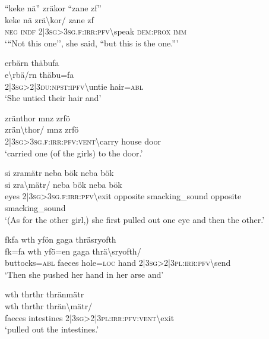 \ea\label{ex:6:a1281}
``keke nä'' zräkor ``zane zf''\\
\gll keke	nä	zrä{\textbackslash}kor/	zane	zf\\
     \textsc{neg}	\textsc{indf}	2|3\textsc{sg}>3\textsc{sg}.\textsc{f}:\textsc{irr}:\textsc{pfv}{\textbackslash}speak	\textsc{dem}:\textsc{prox}	\textsc{imm}\\
\glt `{``}Not this one'', she said, ``but this is the one.'''
\z

\ea\label{ex:6:a1282}
erbärn thäbufa\\
\gll e{\textbackslash}rbä/rn	thäbu=fa\\
     2|3\textsc{sg}>2|3\textsc{du}:\textsc{npst}:\textsc{ipfv}{\textbackslash}untie	hair=\textsc{abl}\\
\glt `She untied their hair and'
\z

\ea\label{ex:6:a1283}
zränthor mnz zrfö\\
\gll zrän{\textbackslash}thor/	mnz	zrfö\\
     2|3\textsc{sg}>3\textsc{sg}.\textsc{f}:\textsc{irr}:\textsc{pfv}:\textsc{vent}{\textbackslash}carry	house	door\\
\glt `carried one (of the girls) to the door.'
\z

\ea\label{ex:6:a1284}
si zramätr neba bök neba bök\\
\gll si	zra{\textbackslash}mätr/	neba	bök	neba	bök\\
     eyes	2|3\textsc{sg}>3\textsc{sg}.\textsc{f}:\textsc{irr}:\textsc{pfv}{\textbackslash}exit	opposite	smacking\_sound	opposite	smacking\_sound\\
\glt `(As for the other girl,) she first pulled out one eye and then the other.'
\z

\ea\label{ex:6:a1286}
fkfa wth yfön gaga thräsryofth\\
\gll fk=fa	wth	yfö=en	gaga	thrä{\textbackslash}sryofth/\\
     buttocks=\textsc{abl}	faeces	hole=\textsc{loc}	hand	2|3\textsc{sg}>2|3\textsc{pl}:\textsc{irr}:\textsc{pfv}{\textbackslash}send\\
\glt `Then she pushed her hand in her arse and'
\z

\ea\label{ex:6:a1287}
wth thrthr thränmätr\\
\gll wth	thrthr	thrän{\textbackslash}mätr/\\
     faeces	intestines	2|3\textsc{sg}>2|3\textsc{pl}:\textsc{irr}:\textsc{pfv}:\textsc{vent}{\textbackslash}exit\\
\glt `pulled out the intestines.'
\z

